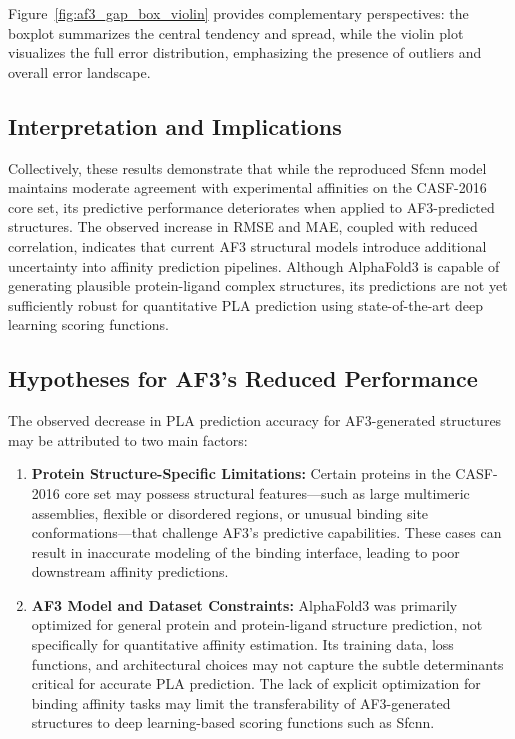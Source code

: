 \documentclass[unnumsec,webpdf,contemporary,large]{oup-authoring-template}
\theoremstyle{thmstyleone}%
\theoremstyle{thmstyletwo}%
\theoremstyle{thmstylethree}%
\begin{document}
Figure~\ref{fig:af3_gap_box_violin} provides complementary perspectives: the boxplot summarizes the central tendency and spread, while the violin plot visualizes the full error distribution, emphasizing the presence of outliers and overall error landscape.

\subsection{Interpretation and Implications}
Collectively, these results demonstrate that while the reproduced Sfcnn model 
maintains moderate agreement with experimental affinities on the CASF-2016 core set, 
its predictive performance deteriorates when applied to AF3-predicted structures. 
The observed increase in RMSE and MAE, coupled with reduced correlation, 
indicates that current AF3 structural models introduce additional uncertainty into affinity 
prediction pipelines. Although AlphaFold3 is capable of generating plausible 
protein-ligand complex structures, its predictions are not yet sufficiently robust for 
quantitative PLA prediction using state-of-the-art deep learning scoring functions.

\subsection{Hypotheses for AF3's Reduced Performance}
The observed decrease in PLA prediction accuracy for AF3-generated structures may be attributed to two main factors:

\begin{enumerate}
    \item \textbf{Protein Structure-Specific Limitations:} Certain proteins in the CASF-2016 core set may possess structural features—such as large multimeric assemblies, flexible or disordered regions, or unusual binding site conformations—that challenge AF3's predictive capabilities. These cases can result in inaccurate modeling of the binding interface, leading to poor downstream affinity predictions.
    \item \textbf{AF3 Model and Dataset Constraints:} AlphaFold3 was primarily optimized for general protein and protein-ligand structure prediction, not specifically for quantitative affinity estimation. Its training data, loss functions, and architectural choices may not capture the subtle determinants critical for accurate PLA prediction. The lack of explicit optimization for binding affinity tasks may limit the transferability of AF3-generated structures to deep learning-based scoring functions such as Sfcnn.
\end{enumerate}
\end{document}
